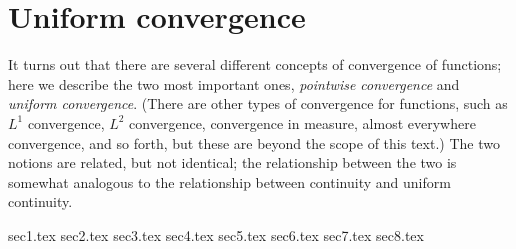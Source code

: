 \chapter{Uniform convergence}\label{ii:ch:3}

\begin{note}
  It turns out that there are several different concepts of convergence of functions;
  here we describe the two most important ones, \emph{pointwise convergence} and \emph{uniform convergence}.
  (There are other types of convergence for functions, such as \(L^1\) convergence, \(L^2\) convergence, convergence in measure, almost everywhere convergence, and so forth, but these are beyond the scope of this text.)
  The two notions are related, but not identical;
  the relationship between the two is somewhat analogous to the relationship between continuity and uniform continuity.
\end{note}

{sec1.tex}
{sec2.tex}
{sec3.tex}
{sec4.tex}
{sec5.tex}
{sec6.tex}
{sec7.tex}
{sec8.tex}
